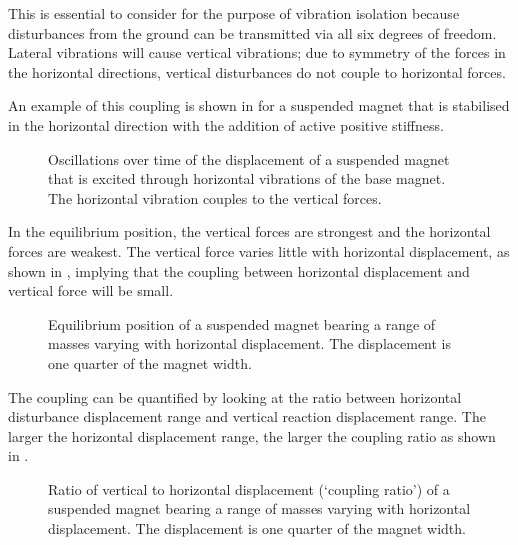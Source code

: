 This is essential to consider for the purpose of vibration isolation because
disturbances from the ground can be transmitted via all six degrees of
freedom. Lateral vibrations will cause vertical vibrations; due to symmetry of
the forces in the horizontal directions, vertical disturbances do not couple
to horizontal forces.

An example of this coupling is shown in  for a
suspended magnet that is stabilised in the horizontal direction with the
addition of active positive stiffness. 

\begin{figure}
  \caption{Oscillations over time of the displacement of a suspended magnet that is excited through horizontal vibrations of the base magnet. The horizontal vibration couples to the vertical forces.}
\end{figure}

In the equilibrium position, the vertical forces are strongest and the
horizontal forces are weakest. The vertical force varies little with
horizontal displacement, as shown in , implying
that the coupling between horizontal displacement and vertical force will be
small.

\begin{figure}
  \caption{Equilibrium position of a suspended magnet bearing a range of
  masses varying with horizontal displacement.
  The displacement is one quarter of the magnet width.}
\end{figure}

The coupling can be quantified by looking at the ratio between horizontal
disturbance displacement range and vertical reaction displacement range. The
larger the horizontal displacement range, the larger the coupling ratio as
shown in .

\begin{figure}
  \caption{Ratio of vertical to horizontal displacement (`coupling ratio') of
  a suspended magnet bearing a range of masses varying with horizontal
  displacement. The displacement is one quarter of the magnet width.}
\end{figure}

